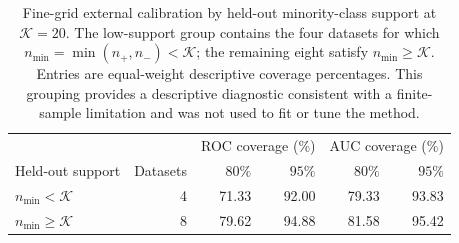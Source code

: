 \begin{table}[t]
\centering
\caption{Fine-grid external calibration by held-out minority-class support at $\mathcal K=20$. The low-support group contains the four datasets for which $n_{\min}=\min(n_+,n_-)<\mathcal K$; the remaining eight satisfy $n_{\min}\ge\mathcal K$. Entries are equal-weight descriptive coverage percentages. This grouping provides a descriptive diagnostic consistent with a finite-sample limitation and was not used to fit or tune the method.}
\label{tab:empirical-evaluation-on-real-world-datasets-fine-grid-support}
\begingroup
\small
\setlength{\tabcolsep}{5pt}
\renewcommand{\arraystretch}{1.12}
\begin{tabular}{@{}lrrrrr@{}}
\hline
 & & \multicolumn{2}{c}{ROC coverage (\%)} & \multicolumn{2}{c}{AUC coverage (\%)} \\
Held-out support & Datasets & $80\%$ & $95\%$ & $80\%$ & $95\%$ \\
\hline
$n_{\min}<\mathcal K$ & 4 & 71.33 & 92.00 & 79.33 & 93.83 \\
$n_{\min}\ge\mathcal K$ & 8 & 79.62 & 94.88 & 81.58 & 95.42 \\
\hline
\end{tabular}
\endgroup
\end{table}
